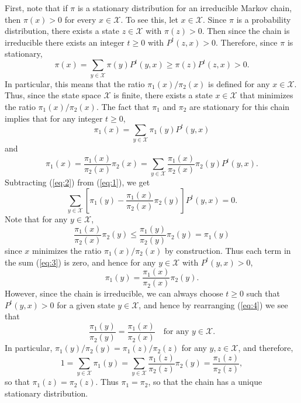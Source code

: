\documentclass[12pt]{article}
\begin{document}
First, note that if $\pi$ is a stationary distribution for an irreducible Markov chain, then $\pi(x) > 0$ for every $x \in \mathcal{X}$. To see this, let $x \in \mathcal{X}$. Since $\pi$ is a probability distribution, there exists a state $z \in \mathcal{X}$ with $\pi(z) > 0$. Then since the chain is irreducible there exists an integer $t \geq 0$ with $P^t(z, x) > 0$. Therefore, since $\pi$ is stationary,
\begin{equation*}
\pi(x) = \sum_{y \in \mathcal{X}} \pi(y) P^t(y, x) \geq \pi(z) P^t(z, x) > 0.
\end{equation*}
In particular, this means that the ratio $\pi_1(x) / \pi_2(x)$ is defined for any $x \in \mathcal{X}$. Thus, since the state space $\mathcal{X}$ is finite, there exists a state $x \in \mathcal{X}$ that minimizes the ratio $\pi_1(x) / \pi_2(x)$. The fact that $\pi_1$ and $\pi_2$ are stationary for this chain implies that for any integer $t \geq 0$,
\begin{equation} \label{eq:1}
\pi_1(x) = \sum_{y \in \mathcal{X}} \pi_1(y) P^t(y, x)
\end{equation}
and
\begin{equation} \label{eq:2}
\pi_1(x) = \frac{\pi_1(x)}{\pi_2(x)} \pi_2(x) = \sum_{y \in \mathcal{X}} \frac{\pi_1(x)}{\pi_2(x)} \pi_2(y) P^t(y, x).
\end{equation}
Subtracting (\ref{eq:2}) from (\ref{eq:1}), we get
\begin{equation} \label{eq:3}
\sum_{y \in \mathcal{X}} \left[\pi_1(y) - \frac{\pi_1(x)}{\pi_2(x)} \pi_2(y) \right] P^t(y, x) = 0.
\end{equation}
Note that for any $y \in \mathcal{X}$,
\begin{equation*}
\frac{\pi_1(x)}{\pi_2(x)} \pi_2(y) \leq \frac{\pi_1(y)}{\pi_2(y)} \pi_2(y) = \pi_1(y)
\end{equation*}
since $x$ minimizes the ratio $\pi_1(x) / \pi_2(x)$ by construction. Thus each term in the sum (\ref{eq:3}) is zero, and hence for any $y \in \mathcal{X}$ with $P^t(y, x) > 0$,
\begin{equation} \label{eq:4}
\pi_1(y) = \frac{\pi_1(x)}{\pi_2(x)} \pi_2(y).
\end{equation}
However, since the chain is irreducible, we can always choose $t \geq 0$ such that $P^t(y, x) > 0$ for a given state $y \in \mathcal{X}$, and hence by rearranging (\ref{eq:4}) we see that
\begin{equation*}
\frac{\pi_1(y)}{\pi_2(y)} = \frac{\pi_1(x)}{\pi_2(x)} \quad \text{for any $y \in \mathcal{X}$}.
\end{equation*}
In particular, $\pi_1(y) / \pi_2(y) = \pi_1(z) / \pi_2(z)$ for any $y, z \in \mathcal{X}$, and therefore,
\begin{equation*}
1 = \sum_{y \in \mathcal{X}} \pi_1(y) = \sum_{y \in \mathcal{X}} \frac{\pi_1(z)}{\pi_2(z)} \pi_2(y) = \frac{\pi_1(z)}{\pi_2(z)},
\end{equation*}
so that $\pi_1(z) = \pi_2(z)$. Thus $\pi_1 = \pi_2$, so that the chain has a unique stationary distribution.
\end{document}

